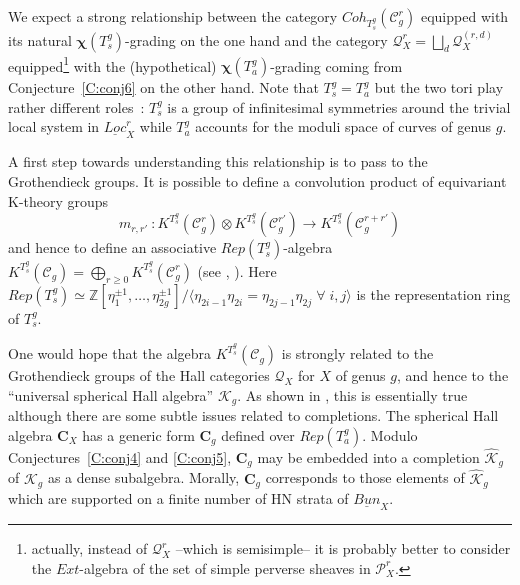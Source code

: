 \documentclass[a4paper,10pt]{amsart}
\def\Z{\mathbb{Z}}
\numberwithin{equation}{section}
\begin{document}
\vspace{.1in}

We expect a strong relationship between the category $Coh_{T^g_s}(\mathcal{C}^r_g)$ equipped with its natural $\boldsymbol{\chi}(T^g_s)$-grading on the one hand and the category $\mathcal{Q}_X^r=\bigsqcup_{d} \mathcal{Q}^{(r,d)}_X$ equipped\footnote{actually, instead of $\mathcal{Q}_X^r$ --which is semisimple-- it is probably better to consider the $Ext$-algebra of the set of simple perverse sheaves in $\mathcal{P}_X^r$.} with the (hypothetical) $\boldsymbol{\chi}(T^g_a)$-grading coming from Conjecture~\ref{C:conj6} on the other hand. Note that $T^g_s=T^g_a$ but the two tori play rather different roles~: $T^g_s$ is a group of infinitesimal symmetries around the trivial local system in $\underline{Loc}^r_X$ while $T^g_a$ accounts for the moduli space of curves of genus $g$.

\vspace{.1in}

A first step towards understanding this relationship is to pass to the Grothendieck groups. It is possible to define a convolution product of equivariant K-theory groups 
$$m_{r,r'}~:K^{T^g_s}(\mathcal{C}^r_{g}) \otimes K^{T^g_s}(\mathcal{C}^{r'}_g) \to K^{T^g_s}(\mathcal{C}_g^{r+r'})$$
and hence to define an associative $Rep(T^g_s)$-algebra $K^{T^g_s}(\mathcal{C}_g)=\bigoplus_{r \geq 0} K^{T^g_s}(\mathcal{C}^r_{g})$ (see \cite{SV2}, \cite{SV3}). 
Here $Rep(T^g_s) \simeq \Z[ \eta_1^{\pm 1}, \ldots, \eta_{2g}^{\pm 1}]/ \langle \eta_{2i-1}\eta_{2i}=\eta_{2j-1}\eta_{2j}\;\forall\; i, j \rangle$ is the representation ring of $T^g_s$.

\vspace{.1in}

One would hope that the algebra $K^{T^g_s}(\mathcal{C}_g)$ is strongly related to the Grothendieck groups of the Hall categories $\mathcal{Q}_X$ for $X$ of genus $g$, and hence to the ``universal spherical Hall algebra'' $\mathcal{K}_g$. As shown in \cite{SV3}, this is essentially true although there are some subtle issues related to completions. The spherical Hall algebra $\mathbf{C}_X$ has a generic form $\mathbf{C}_g$ defined over $Rep(T^g_a)$. Modulo Conjectures~\ref{C:conj4} and \ref{C:conj5}, $\mathbf{C}_g$ may be embedded into a completion $\widehat{\mathcal{K}}_g$ of $\mathcal{K}_g$ as a dense subalgebra. Morally, $\mathbf{C}_g$ corresponds to those elements of $\widehat{\mathcal{K}}_g$ which are supported on a finite number of HN strata of $\underline{Bun}_X$.
\end{document}
